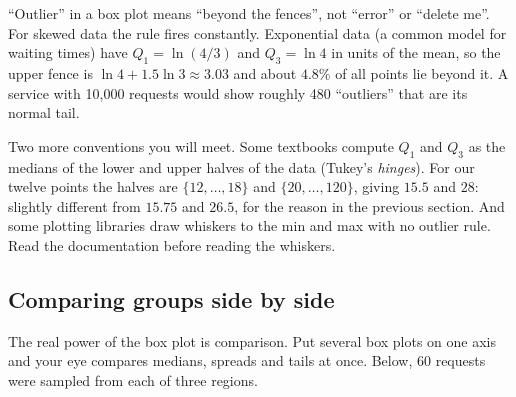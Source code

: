 \begin{trapbox}
``Outlier'' in a box plot means ``beyond the fences'', not ``error'' or ``delete me''. For
skewed data the rule fires constantly. Exponential data (a common model for waiting
times) have $Q_1 = \ln(4/3)$ and $Q_3 = \ln 4$ in units of the mean, so the upper
fence is $\ln 4 + 1.5\ln 3 \approx 3.03$ and about $4.8\%$ of all points lie beyond it.
A service with 10{,}000 requests would show roughly 480 ``outliers'' that are
its normal tail.
\end{trapbox}

Two more conventions you will meet. Some textbooks compute $Q_1$ and $Q_3$ as the
medians of the lower and upper halves of the data (Tukey's \emph{hinges}). For our
twelve points the halves are $\{12,\dots,18\}$ and $\{20,\dots,120\}$, giving $15.5$
and $28$: slightly different from $15.75$ and $26.5$, for the reason in the previous
section. And some plotting libraries draw whiskers to the min and max with no
outlier rule. Read the documentation before reading the whiskers.

\subsection{Comparing groups side by side}

The real power of the box plot is comparison. Put several box plots on one axis and
your eye compares medians, spreads and tails at once. Below, 60 requests were sampled
from each of three regions.

